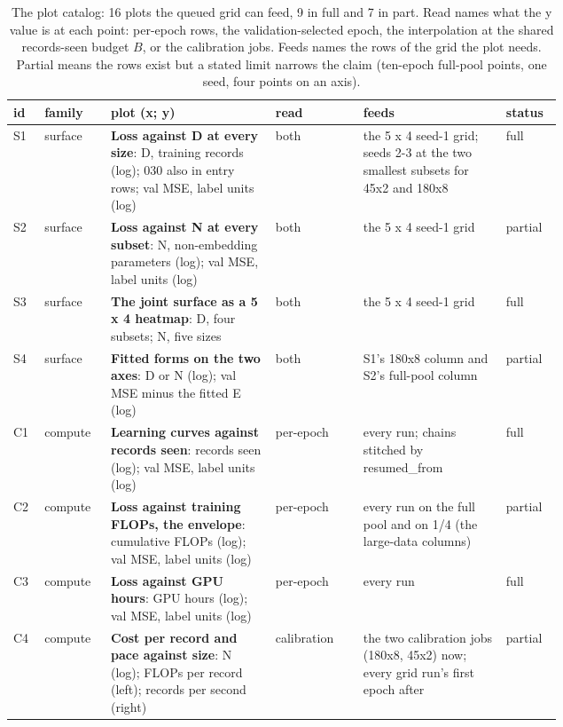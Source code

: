 \begin{table}[htbp]
\centering\footnotesize
\caption{The plot catalog: 16 plots the queued grid can feed, 9 in full and 7 in part. Read names what the y value is at each point: per-epoch rows, the validation-selected epoch, the interpolation at the shared records-seen budget $B$, or the calibration jobs. Feeds names the rows of the grid the plot needs. Partial means the rows exist but a stated limit narrows the claim (ten-epoch full-pool points, one seed, four points on an axis).}
\label{tab:catalog}
\begin{tabular}{llp{0.30\linewidth}p{0.16\linewidth}p{0.26\linewidth}l}
\toprule
id & family & plot (x; y) & read & feeds & status \\
\midrule
S1 & surface & \textbf{Loss against D at every size}: D, training records (log); 030 also in entry rows; val MSE, label units (log) & both & the 5 x 4 seed-1 grid; seeds 2-3 at the two smallest subsets for 45x2 and 180x8 & full \\
S2 & surface & \textbf{Loss against N at every subset}: N, non-embedding parameters (log); val MSE, label units (log) & both & the 5 x 4 seed-1 grid & partial \\
S3 & surface & \textbf{The joint surface as a 5 x 4 heatmap}: D, four subsets; N, five sizes & both & the 5 x 4 seed-1 grid & full \\
S4 & surface & \textbf{Fitted forms on the two axes}: D or N (log); val MSE minus the fitted E (log) & both & S1's 180x8 column and S2's full-pool column & partial \\
C1 & compute & \textbf{Learning curves against records seen}: records seen (log); val MSE, label units (log) & per-epoch & every run; chains stitched by resumed\_from & full \\
C2 & compute & \textbf{Loss against training FLOPs, the envelope}: cumulative FLOPs (log); val MSE, label units (log) & per-epoch & every run on the full pool and on 1/4 (the large-data columns) & partial \\
C3 & compute & \textbf{Loss against GPU hours}: GPU hours (log); val MSE, label units (log) & per-epoch & every run & full \\
C4 & compute & \textbf{Cost per record and pace against size}: N (log); FLOPs per record (left); records per second (right) & calibration & the two calibration jobs (180x8, 45x2) now; every grid run's first epoch after & partial \\

\end{tabular}
\end{table}
